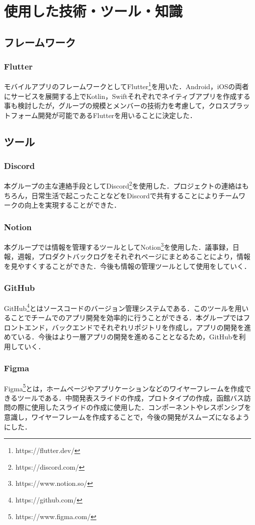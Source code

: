 \chapter{使用した技術・ツール・知識}

\section{フレームワーク}
\subsection{Flutter}
モバイルアプリのフレームワークとしてFlutter\footnote{https://flutter.dev/}を用いた．Android，iOSの両者にサービスを展開する上でKotlin，Swiftそれぞれでネイティブアプリを作成する事も検討したが，グループの規模とメンバーの技術力を考慮して，クロスプラットフォーム開発が可能であるFlutterを用いることに決定した．

\section{ツール}
\subsection{Discord}
本グループの主な連絡手段としてDiscord\footnote{https://discord.com/}を使用した．プロジェクトの連絡はもちろん，日常生活で起こったことなどをDiscordで共有することによりチームワークの向上を実現することができた．

\subsection{Notion}
本グループでは情報を管理するツールとしてNotion\footnote{https://www.notion.so/}を使用した．議事録，日報，週報，プロダクトバックログをそれぞれページにまとめることにより，情報を見やすくすることができた．今後も情報の管理ツールとして使用をしていく．

\subsection{GitHub}
GitHub\footnote{https://github.com/}とはソースコードのバージョン管理システムである．このツールを用いることでチームでのアプリ開発を効率的に行うことができる．本グループではフロントエンド，バックエンドでそれぞれリポジトリを作成し，アプリの開発を進めている．今後はより一層アプリの開発を進めることとなるため，GitHubを利用していく．
\pagebreak
\subsection{Figma}
Figma\footnote{https://www.figma.com/}とは，ホームページやアプリケーションなどのワイヤーフレームを作成できるツールである．中間発表スライドの作成，プロトタイプの作成，函館バス訪問の際に使用したスライドの作成に使用した．コンポーネントやレスポンシブを意識し，ワイヤーフレームを作成することで，今後の開発がスムーズになるようにした．


